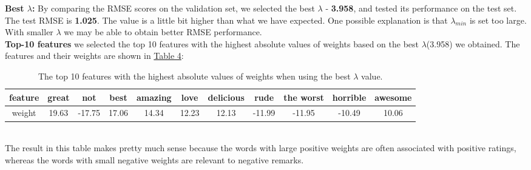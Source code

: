 \documentclass{article}
\begin{document}
        \noindent\textbf{Best $\lambda$: }By comparing the RMSE scores on the validation set, we selected the best $\lambda$ - \textbf{3.958},
        and tested its performance on the test set. The test RMSE is \textbf{1.025}. 
        The value is a little bit higher than what we have expected. One possible explanation is that $\lambda_{min}$ is set too large.
        With smaller $\lambda$ we may be able to obtain better RMSE performance.
        \vspace{5pt}\\
        \textbf{Top-10 features} we selected the top 10 features with the highest absolute values of weights based on the best $\lambda$(3.958) we obtained.
        The features and their weights are shown in \hyperref[tab:2.5]{Table 4}:
        \begin{table}[hbt!]
            \centering
            \begin{tabular}{|c||c|c|c|c|c|c|c|c|c|c|}
                \hline
                feature&great&not&best&amazing&love&delicious&rude&the worst&horrible&awesome\\
                \hline\hline
                weight&19.63&-17.75&17.06&14.34&12.23&12.13&-11.99&-11.95&-10.49&10.06\\
                \hline
            \end{tabular}
            \label{tab:2.5}
            \caption{The top 10 features with the highest absolute values of weights when using the best $\lambda$ value.}
        \end{table}\\
        The result in this table makes pretty much sense because the words with large positive weights are often associated with positive ratings,
        whereas the words with small negative weights are relevant to negative remarks.
\end{document}
